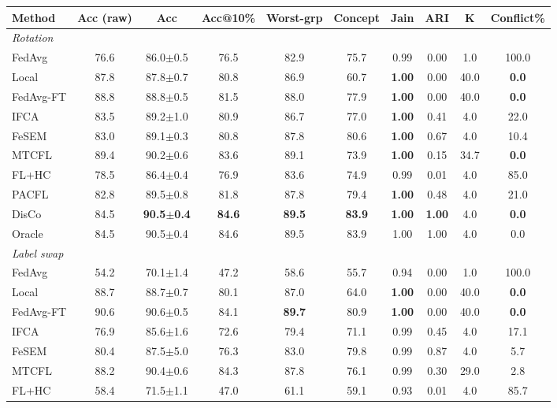 \scriptsize
\setlength{\tabcolsep}{3.2pt}
\begin{tabular}{lccccccccc}
\toprule
Method & Acc (raw) & Acc & Acc@10\% & Worst-grp & Concept & Jain & ARI & K & Conflict\% \\
\midrule
\multicolumn{10}{l}{\textit{Rotation}}\\
FedAvg & 76.6 & 86.0$\pm$0.5 & 76.5 & 82.9 & 75.7 & 0.99 & 0.00 & 1.0 & 100.0 \\
Local & 87.8 & 87.8$\pm$0.7 & 80.8 & 86.9 & 60.7 & \textbf{1.00} & 0.00 & 40.0 & \textbf{0.0} \\
FedAvg-FT & 88.8 & 88.8$\pm$0.5 & 81.5 & 88.0 & 77.9 & \textbf{1.00} & 0.00 & 40.0 & \textbf{0.0} \\
IFCA & 83.5 & 89.2$\pm$1.0 & 80.9 & 86.7 & 77.0 & \textbf{1.00} & 0.41 & 4.0 & 22.0 \\
FeSEM & 83.0 & 89.1$\pm$0.3 & 80.8 & 87.8 & 80.6 & \textbf{1.00} & 0.67 & 4.0 & 10.4 \\
MTCFL & 89.4 & 90.2$\pm$0.6 & 83.6 & 89.1 & 73.9 & \textbf{1.00} & 0.15 & 34.7 & \textbf{0.0} \\
FL+HC & 78.5 & 86.4$\pm$0.4 & 76.9 & 83.6 & 74.9 & 0.99 & 0.01 & 4.0 & 85.0 \\
PACFL & 82.8 & 89.5$\pm$0.8 & 81.8 & 87.8 & 79.4 & \textbf{1.00} & 0.48 & 4.0 & 21.0 \\
DisCo & 84.5 & \textbf{90.5$\pm$0.4} & \textbf{84.6} & \textbf{89.5} & \textbf{83.9} & \textbf{1.00} & \textbf{1.00} & 4.0 & \textbf{0.0} \\
Oracle & 84.5 & 90.5$\pm$0.4 & 84.6 & 89.5 & 83.9 & 1.00 & 1.00 & 4.0 & 0.0 \\
\midrule
\multicolumn{10}{l}{\textit{Label swap}}\\
FedAvg & 54.2 & 70.1$\pm$1.4 & 47.2 & 58.6 & 55.7 & 0.94 & 0.00 & 1.0 & 100.0 \\
Local & 88.7 & 88.7$\pm$0.7 & 80.1 & 87.0 & 64.0 & \textbf{1.00} & 0.00 & 40.0 & \textbf{0.0} \\
FedAvg-FT & 90.6 & 90.6$\pm$0.5 & 84.1 & \textbf{89.7} & 80.9 & \textbf{1.00} & 0.00 & 40.0 & \textbf{0.0} \\
IFCA & 76.9 & 85.6$\pm$1.6 & 72.6 & 79.4 & 71.1 & 0.99 & 0.45 & 4.0 & 17.1 \\
FeSEM & 80.4 & 87.5$\pm$5.0 & 76.3 & 83.0 & 79.8 & 0.99 & 0.87 & 4.0 & 5.7 \\
MTCFL & 88.2 & 90.4$\pm$0.6 & 84.3 & 87.8 & 76.1 & 0.99 & 0.30 & 29.0 & 2.8 \\
FL+HC & 58.4 & 71.5$\pm$1.1 & 47.0 & 61.1 & 59.1 & 0.93 & 0.01 & 4.0 & 85.7 \\

\end{tabular}
